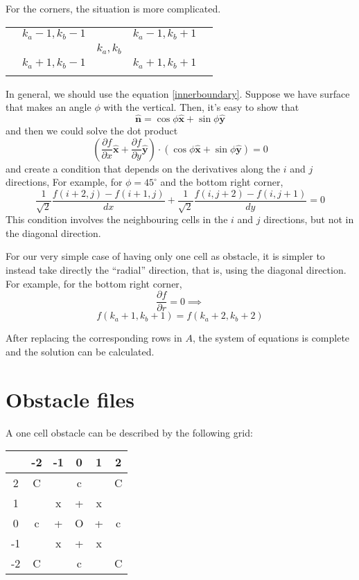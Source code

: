 \documentclass{article}
\newcommand{\uv}[1]{\hat{\mathbf{#1}}}
\begin{document}
\vspace{2em}

For the corners, the situation is more complicated.

\begin{tabular}{c|c|c|c|c}
& & & & \\ \hline
& $k_a-1,k_b-1$ & & $k_a-1,k_b+1$ & \\ \hline
& & $k_a,k_b$ & & \\ \hline
& $k_a+1,k_b-1$ & & $k_a+1,k_b+1$ &\\ \hline
& & & &
\end{tabular}

In general, we should use the equation \ref{innerboundary}. Suppose we have surface
that makes an angle $\phi$ with the vertical. Then, it's easy to show that
\[ \uv n = \cos\phi \uv x + \sin\phi \uv y \]
and then we could solve the dot product
\[ \left(\frac{\partial f}{\partial x} \uv x + \frac{\partial f}{\partial y}\uv y\right)
\cdot
(\cos\phi \uv x + \sin\phi \uv y)
=0 \]
and create a condition that depends on the derivatives along the $i$ and $j$ directions,
For example, for $\phi = 45^\circ$ and the bottom right corner,
\[ \frac{1}{\sqrt{2}}\frac{f(i+2,j)-f(i+1,j)}{dx} +
\frac{1}{\sqrt{2}}\frac{f(i,j+2)-f(i,j+1)}{dy} = 0\]
This condition involves the neighbouring cells in the $i$ and $j$ directions, but
not in the diagonal direction.

For our very simple case of having only one cell as obstacle, it is simpler to
instead take directly the ``radial'' direction,
that is, using the diagonal direction. For example, for the bottom right corner,
\[ \frac{\partial f}{\partial r} = 0 \implies \]
\[ f(k_a+1,k_b+1) = f(k_a+2,k_b+2) \]

After replacing the corresponding rows in $A$, the system of equations is complete
and the solution can be calculated.


\section{Obstacle files}
A one cell obstacle can be described by the following grid:

\begin{tabular}{|c||c|c|c|c|c|}
\hline
	&-2	&-1	&0	&1	&2	\\ \hline\hline
2	&C	&	&c	&	&C	\\ \hline
1	&	&x	&+	&x	&	\\ \hline
0	&c	&+	&O	&+	&c	\\ \hline
-1	&	&x	&+	&x	&	\\ \hline
-2	&C	&	&c	&	&C	\\ \hline
\end{tabular}
\end{document}
